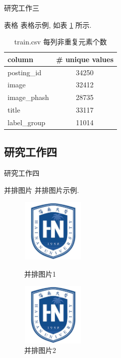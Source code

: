 \documentclass{beamer}
\begin{document}
\begin{frame}{研究工作三}
  \begin{block}{表格}
    表格示例, 如表 \ref{tab:unique_values} 所示. 

    \begin{table}[htbp]
      \small
      \centering
      \caption{train.csv 每列非重复元素个数}
      \label{tab:unique_values}
      \begin{tabular}{lc}
        \toprule
        column & \# unique values \\
        \midrule
        posting\_id & 34250 \\
        image & 32412 \\
        image\_phash & 28735 \\
        title & 33117 \\
        label\_group & 11014 \\
        \bottomrule
      \end{tabular}
    \end{table}
  \end{block}
\end{frame}

\subsection{研究工作四}

\begin{frame}{研究工作四}
  \begin{block}{并排图片}
    并排图片示例.
  \end{block}
  \begin{figure}[htbp]
    \centering
    \begin{minipage}[t]{0.48\textwidth}
      \centering
      \includegraphics[width=3cm]{hainanulogo.pdf}
      \caption{并排图片1}
      \label{fig:left_side}
    \end{minipage}
    \begin{minipage}[t]{0.48\textwidth}
      \centering
      \includegraphics[width=3cm]{hainanulogo.pdf}
      \caption{并排图片2}
      \label{fig:right_side}
    \end{minipage}
  \end{figure}
\end{frame}
\end{document}
